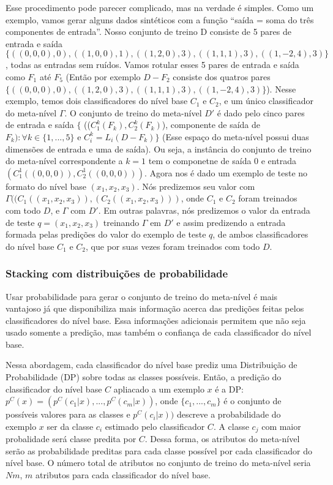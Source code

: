 \documentclass[]{article}
\begin{document}
Esse procedimento pode parecer complicado, mas na verdade é simples.
Como um exemplo, vamos gerar alguns dados sintéticos com a função
``saída = soma do três componentes de entrada''. Nosso conjunto de
treino D consiste de 5 pares de entrada e saída
\(\{((0,0,0),0), ((1,0,0),1), ((1,2,0),3), ((1,1,1),3), ((1,-2,4),3)\}\),
todas as entradas sem ruídos. Vamos rotular esses 5 pares de entrada e
saída como \(F_1\) até \(F_5\) (Então por exemplo \(D - F_2\) consiste
dos quatros pares
\(\{((0,0,0),0), ((1,2,0),3), ((1,1,1),3), ((1,-2,4),3)\}\)). Nesse
exemplo, temos dois classificadores do nível base \(C_1\) e \(C_2\), e
um único classificador do meta-nível \(\Gamma\). O conjunto de treino do
meta-nível \(D'\) é dado pelo cinco pares de entrada e saída \(\{\)
((\(C_1^k(F_k), C_2^k(F_k)\)), componente de saída de
\(F_k) : \forall k \in \{1,...,5\}\) e \(C_i^k = L_i(D-F_k)\}\) (Esse
espaço do meta-nível possui duas dimensões de entrada e uma de saída).
Ou seja, a instância do conjunto de treino do meta-nível correspondente
a \(k = 1\) tem o componetne de saída 0 e entrada
\((C_1^1((0,0,0)), C_2^1((0,0,0)))\). Agora nos é dado um exemplo de
teste no formato do nível base \((x_1, x_2, x_3)\). Nós predizemos seu
valor com \(\Gamma((C_1((x_1, x_2, x_3)), (C_2((x_1, x_2, x_3)))\), onde
\(C_1\) e \(C_2\) foram treinados com todo \(D\), e \(\Gamma\) com
\(D'\). Em outras palavras, nós predizemos o valor da entrada de teste
\(q = (x_1, x_2, x_3)\) treinando \(\Gamma\) em \(D'\) e assim
predizendo a entrada formada pelas predições do valor do exemplo de
teste \(q\), de ambos classificadores do nível base \(C_1\) e \(C_2\),
que por suas vezes foram treinados com todo \(D\).

\subsubsection{Stacking com distribuições de
probabilidade}\label{stacking-com-distribuicoes-de-probabilidade}

Usar probabilidade para gerar o conjunto de treino do meta-nível é mais
vantajoso já que disponibiliza mais informação acerca das predições
feitas pelos classificadores do nível base. Essa informações adicionais
permitem que não seja usado somente a predição, mas também o confiança
de cada classificador do nível base.

Nessa abordagem, cada classificador do nível base prediz uma
Distribuição de Probabilidade (DP) sobre todas as classes possíveis.
Então, a predição do classificador do nível base \(C\) apliacado a um
exemplo \(x\) é a DP: \(p^C(x) = (p^C(c_1|x), ... , p^C(c_m|x))\), onde
\(\{c_1, ..., c_m\}\) é o conjunto de possíveis valores para as classes
e \(p^C(c_i|x))\) descreve a probabilidade do exemplo \(x\) ser da
classe \(c_i\) estimado pelo classificador \(C\). A classe \(c_j\) com
maior probalidade será classe predita por \(C\). Dessa forma, os
atributos do meta-nível serão as probabilidade preditas para cada classe
possível por cada classificador do nível base. O número total de
atributos no conjunto de treino do meta-nível seria \(Nm\), \(m\)
atributos para cada classificador do nível base.
\end{document}
